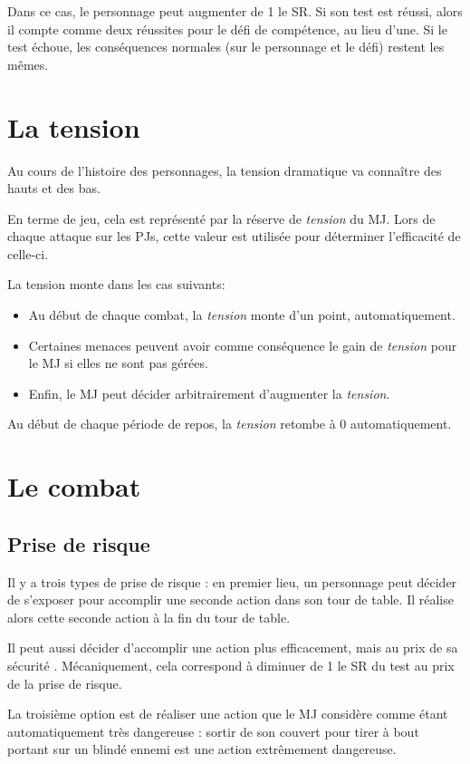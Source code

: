 \documentclass{report}
\begin{document}
\begin{multicols}{2}
Dans ce cas, le personnage peut augmenter de 1 le SR. Si son test est réussi, alors il compte comme deux réussites pour le défi de compétence, au lieu d'une. Si le test échoue, les conséquences normales (sur le personnage et le défi) restent les mêmes.

\section{La tension}
Au cours de l'histoire des personnages, la tension dramatique va connaître des hauts et des bas.

En terme de jeu, cela est représenté par la réserve de \emph{tension} du MJ. Lors de chaque attaque sur les PJs, cette valeur est utilisée pour déterminer l'efficacité de celle-ci.

La tension monte dans les cas suivants:
\begin{itemize}
    \item Au début de chaque combat, la \emph{tension} monte d'un point, automatiquement.
    \item Certaines menaces peuvent avoir comme conséquence le gain de \emph{tension} pour le MJ si elles ne sont pas gérées.
    \item Enfin, le MJ peut décider arbitrairement d'augmenter la \emph{tension}. %
\end{itemize}
Au début de chaque période de repos, la \emph{tension} retombe à 0 automatiquement.
\section{Le combat}

\subsection{Prise de risque}
\label{risque}
Il y a trois types de prise de risque : en premier lieu, un personnage peut décider de s'exposer pour accomplir une seconde action dans son tour de table. Il réalise alors cette seconde action à la fin du tour de table.

Il peut aussi décider d'accomplir une action plus efficacement, mais au prix de sa sécurité . Mécaniquement, cela correspond à diminuer de 1 le SR du test au prix de la prise de risque.

La troisième option est de réaliser une action que le MJ considère comme étant automatiquement très dangereuse : sortir de son couvert pour tirer à bout portant sur un blindé ennemi est une action extrêmement dangereuse.


\end{multicols}
\end{document}
